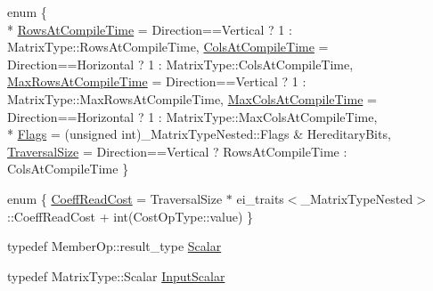\begin{DoxyCompactItemize}
\item 
enum \{ \\*
\hyperlink{structei__traits_3_01_partial_redux_expr_3_01_matrix_type_00_01_member_op_00_01_direction_01_4_01_4_aba326fa0834fe1b68621481b483a1f4faac90526d6810c7480170b59065bbd525}{Rows\-At\-Compile\-Time} = Direction==Vertical ? 1 \-: Matrix\-Type\-:\-:Rows\-At\-Compile\-Time, 
\hyperlink{structei__traits_3_01_partial_redux_expr_3_01_matrix_type_00_01_member_op_00_01_direction_01_4_01_4_aba326fa0834fe1b68621481b483a1f4fafc3af15224894cca47aa97c6d16af456}{Cols\-At\-Compile\-Time} = Direction==Horizontal ? 1 \-: Matrix\-Type\-:\-:Cols\-At\-Compile\-Time, 
\hyperlink{structei__traits_3_01_partial_redux_expr_3_01_matrix_type_00_01_member_op_00_01_direction_01_4_01_4_aba326fa0834fe1b68621481b483a1f4faa34bcec427541066742499e986d623ff}{Max\-Rows\-At\-Compile\-Time} = Direction==Vertical ? 1 \-: Matrix\-Type\-:\-:Max\-Rows\-At\-Compile\-Time, 
\hyperlink{structei__traits_3_01_partial_redux_expr_3_01_matrix_type_00_01_member_op_00_01_direction_01_4_01_4_aba326fa0834fe1b68621481b483a1f4faeda8733ec3ce47b57d832f92e5e828de}{Max\-Cols\-At\-Compile\-Time} = Direction==Horizontal ? 1 \-: Matrix\-Type\-:\-:Max\-Cols\-At\-Compile\-Time, 
\\*
\hyperlink{structei__traits_3_01_partial_redux_expr_3_01_matrix_type_00_01_member_op_00_01_direction_01_4_01_4_aba326fa0834fe1b68621481b483a1f4fafb86d8bd9f318774cf36f2a976b43375}{Flags} = (unsigned int)\-\_\-\-Matrix\-Type\-Nested\-:\-:Flags \& Hereditary\-Bits, 
\hyperlink{structei__traits_3_01_partial_redux_expr_3_01_matrix_type_00_01_member_op_00_01_direction_01_4_01_4_aba326fa0834fe1b68621481b483a1f4fa6521b6cf1fb9f5a558de46235b67540b}{Traversal\-Size} = Direction==Vertical ? Rows\-At\-Compile\-Time \-: Cols\-At\-Compile\-Time
 \}
\item 
enum \{ \hyperlink{structei__traits_3_01_partial_redux_expr_3_01_matrix_type_00_01_member_op_00_01_direction_01_4_01_4_a9e8b4a07820fe92849ed6fb867d0c2c0ae026055727bda4e3065b725fe35eafe6}{Coeff\-Read\-Cost} = Traversal\-Size $\ast$ ei\-\_\-traits$<$\-\_\-\-Matrix\-Type\-Nested$>$\-:\-:Coeff\-Read\-Cost + int(Cost\-Op\-Type\-:\-:value)
 \}
\item 
typedef Member\-Op\-::result\-\_\-type \hyperlink{structei__traits_3_01_partial_redux_expr_3_01_matrix_type_00_01_member_op_00_01_direction_01_4_01_4_a283ef4c36b09a8e93ae1b83386792f8f}{Scalar}
\item 
typedef Matrix\-Type\-::\-Scalar \hyperlink{structei__traits_3_01_partial_redux_expr_3_01_matrix_type_00_01_member_op_00_01_direction_01_4_01_4_a8397852e5119754c311a9260900296b9}{Input\-Scalar}

\end{DoxyCompactItemize}
